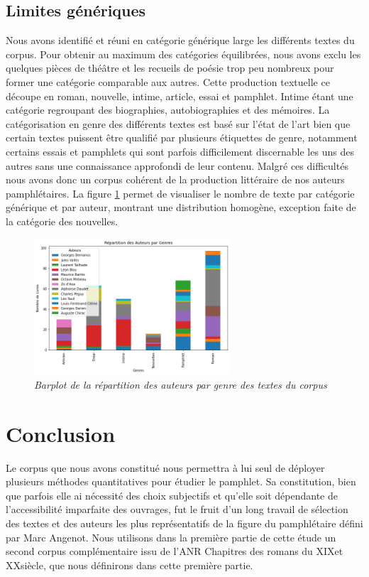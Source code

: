 \subsection{Limites génériques}

Nous avons identifié et réuni en catégorie générique large les différents textes du  corpus. Pour obtenir au maximum des catégories équilibrées, nous avons exclu les quelques pièces de théâtre et les recueils de poésie trop peu nombreux pour former une catégorie comparable aux autres. Cette production textuelle ce découpe en roman, nouvelle, intime, article, essai et pamphlet. Intime étant une catégorie regroupant des biographies, autobiographies et des mémoires. La catégorisation en genre des différents textes est basé sur l'état de l'art bien que certain textes puissent être qualifié par plusieurs étiquettes de genre, notamment certains essais et pamphlets qui sont parfois difficilement discernable les uns des autres sans une connaissance approfondi de leur contenu. Malgré ces difficultés nous avons donc un corpus cohérent de la production littéraire de nos auteurs pamphlétaires. La figure \ref{'fig:repartition_genre'} permet de visualiser le nombre de texte par catégorie générique et par auteur, montrant une distribution homogène, exception faite de la catégorie des nouvelles. 
 \begin{figure}[H]
\centering %
\includegraphics[width=0.65\textwidth]{img/barplot_corpus_genre.png}
\caption{\textit{Barplot de la répartition des auteurs par genre des textes du corpus}}
\label{'fig:repartition_genre'}
\end{figure}

\section{Conclusion}

Le corpus que nous avons constitué nous permettra à lui seul de déployer plusieurs méthodes quantitatives pour étudier le pamphlet. Sa constitution, bien que parfois elle ai nécessité des choix subjectifs et qu'elle soit dépendante de l'accessibilité imparfaite des ouvrages, fut le fruit d'un long travail de sélection des textes et des auteurs les plus représentatifs de la figure du pamphlétaire défini par Marc Angenot. Nous utilisons dans la première partie de cette étude un second corpus complémentaire issu de l'ANR Chapitres des romans du XIX\ieme et XX\ieme siècle, que nous définirons dans cette première partie.

